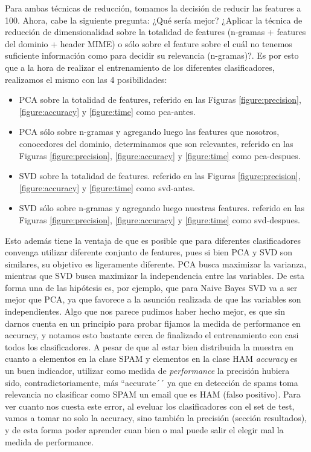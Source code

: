 Para ambas técnicas de reducción, tomamos la decisión de reducir las features a 100. Ahora, cabe la siguiente pregunta: ¿Qué sería mejor? ¿Aplicar la técnica de reducción de dimensionalidad sobre la totalidad de features (n-gramas + features del dominio + header MIME) o sólo sobre el feature sobre el cuál no tenemos suficiente información como para decidir su relevancia (n-gramas)?. Es por esto que a la hora de realizar el entrenamiento de los diferentes clasificadores, realizamos el mismo con las 4 posibilidades:
\begin{itemize}
    \item PCA sobre la totalidad de features, referido en las Figuras \ref{figure:precision}, \ref{figure:accuracy} y \ref{figure:time} como pca-antes.
    \item PCA sólo sobre n-gramas y agregando luego las features que nosotros, conocedores del dominio, determinamos que son relevantes, referido en las Figuras \ref{figure:precision}, \ref{figure:accuracy} y \ref{figure:time} como pca-despues.
    \item SVD sobre la totalidad de features. referido en las Figuras \ref{figure:precision}, \ref{figure:accuracy} y \ref{figure:time} como svd-antes.
    \item SVD sólo sobre n-gramas y agregando luego nuestras features. referido en las Figuras \ref{figure:precision}, \ref{figure:accuracy} y \ref{figure:time} como svd-despues.
\end{itemize}

Esto además tiene la ventaja de que es posible que para diferentes clasificadores convenga utilizar diferente conjunto de features, pues si bien PCA y SVD son similares, su objetivo es ligeramente diferente. PCA busca maximizar la varianza, mientras que SVD busca maximizar la independencia entre las variables. De esta forma una de las hipótesis es, por ejemplo, que para Naive Bayes SVD va a ser mejor que PCA, ya que favorece a la asunción realizada de que las variables son independientes.
Algo que nos parece pudimos haber hecho mejor, es que sin darnos cuenta en un principio para probar fijamos la medida de performance en accuracy, y notamos esto bastante cerca de finalizado el entrenamiento con casi todos los clasificadores. A pesar de que al estar bien distribuida la muestra en cuanto a elementos en la clase SPAM y elementos en la clase HAM \textit{accuracy} es un buen indicador, utilizar como medida de \textit{performance} la precisión hubiera sido, contradictoriamente, más ``accurate´´ ya que en detección de spams toma relevancia no clasificar como SPAM un email que es HAM (falso positivo). Para ver cuanto nos cuesta este error, al eveluar los clasificadores con el set de test, vamos a tomar no solo la accuracy, sino también la precisión (sección resultados), y de esta forma poder aprender cuan bien o mal puede salir el elegir mal la medida de performance.

